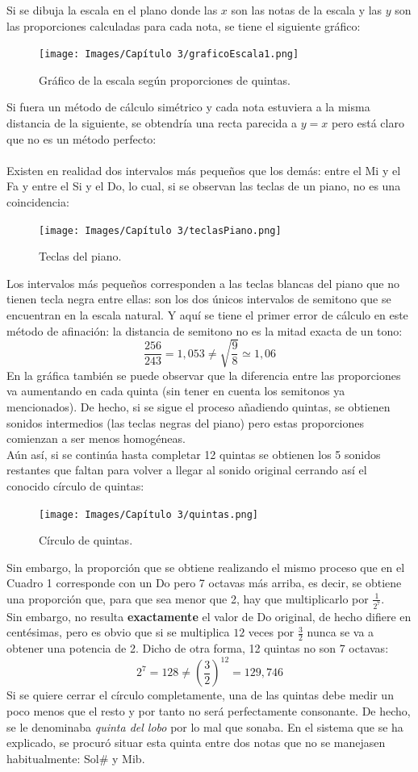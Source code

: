 \documentclass[a4paper, openright, 11pt, titlepage]{report}
\theoremstyle{definition}\newtheorem{defin}[propo]{Definition}
\theoremstyle{definition}\newtheorem{obser}[propo]{Remark}
\theoremstyle{definition}\newtheorem{ejem}[propo]{Ejemplo}
\theoremstyle{definition}\newtheorem{algoritmo}[propo]{Algoritmo}
\begin{document}
Si se dibuja la escala en el plano donde las $x$ son las notas de la escala y las $y$ son las proporciones calculadas para cada nota, se tiene el siguiente gráfico:
\begin{figure}[H]
    \centering
    \texttt{[image: Images/Capítulo 3/graficoEscala1.png]}
    \caption{Gráfico de la escala según proporciones de quintas.}
\end{figure}
Si fuera un método de cálculo simétrico y cada nota estuviera a la misma distancia de la siguiente, se obtendría una recta parecida a $y = x$ pero está claro que no es un método perfecto:\\\\
Existen en realidad dos intervalos más pequeños que los demás: entre el Mi y el Fa y entre el Si y el Do, lo cual, si se observan las teclas de un piano, no es una coincidencia:
\begin{figure}[H]
    \centering
    \texttt{[image: Images/Capítulo 3/teclasPiano.png]}
    \caption{Teclas del piano.}
\end{figure}
Los intervalos más pequeños corresponden a las teclas blancas del piano que no tienen tecla negra entre ellas: son los dos únicos intervalos de semitono que se encuentran en la escala natural. Y aquí se tiene el primer error de cálculo en este método de afinación: la distancia de semitono no es la mitad exacta de un tono: $$\frac{256}{243} = 1,053 \not= \sqrt{\frac{9}{8}} \simeq 1,06$$
En la gráfica también se puede observar que la diferencia entre las proporciones va aumentando en cada quinta (sin tener en cuenta los semitonos ya mencionados). De hecho, si se sigue el proceso añadiendo quintas, se obtienen sonidos intermedios (las teclas negras del piano) pero estas proporciones comienzan a ser menos homogéneas.\\
Aún así, si se continúa hasta completar 12 quintas se obtienen los 5 sonidos restantes que faltan para volver a llegar al sonido original cerrando así el conocido círculo de quintas:
\begin{figure}[H]
    \centering
    \texttt{[image: Images/Capítulo 3/quintas.png]}
    \caption{Círculo de quintas.}
\end{figure}
Sin embargo, la proporción que se obtiene realizando el mismo proceso que en el Cuadro 1 corresponde con un Do pero 7 octavas más arriba, es decir, se obtiene una proporción que, para que sea menor que 2, hay que multiplicarlo por $\frac{1}{2^{7}}$.\\
Sin embargo, no resulta \textbf{exactamente} el valor de Do original, de hecho difiere en centésimas, pero es obvio que si se multiplica $12$ veces por $\frac{3}{2}$ nunca se va a obtener una potencia de 2. Dicho de otra forma, 12 quintas no son 7 octavas: $$2^{7} = 128 \not= (\frac{3}{2})^{12} = 129,746$$
Si se quiere cerrar el círculo completamente, una de las quintas debe medir un poco menos que el resto y por tanto no será perfectamente consonante. De hecho, se le denominaba \textit{quinta del lobo} por lo mal que sonaba. En el sistema que se ha explicado, se procuró situar esta quinta entre dos notas que no se manejasen habitualmente: Sol# y Mib. 
\end{document}

